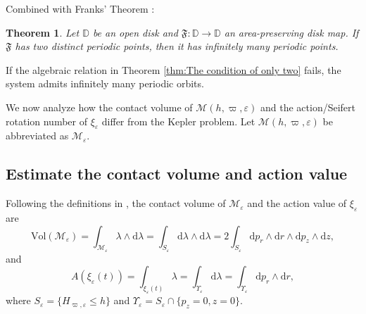 \documentclass[11pt]{amsart}
\newcommand{\ep}{\varepsilon}
\newcommand{\om}{\varpi}
\newtheorem{thm}{Theorem}[section]
\begin{document}
Combined with Franks' Theorem \cite{Franks92}: 
\begin{thm}\label{thm:disk map}  
	Let $ \mathbb{D} $ be an open disk and $ \mathfrak{F}: \mathbb{D} \to \mathbb{D} $ an area-preserving disk map. If $ \mathfrak{F} $ has two distinct periodic points, then it has infinitely many periodic points.  
\end{thm}  
If the algebraic relation in Theorem \ref{thm:The condition of only two} fails, the system admits infinitely many periodic orbits.  

We now analyze how the contact volume of \( \mathcal{M}(h, \om, \ep) \) and the action/Seifert rotation number of $ \xi_{\ep} $ differ from the Kepler problem. Let $ \mathcal{M}(h, \om, \ep) $ be abbreviated as $ \mathcal{M}_\ep $.


\subsection{Estimate the contact volume and action value} Following the definitions in \cite{CHHL23}, the contact volume of $\mathcal{M}_{\ep}$ and the action value of $\xi_{\ep}$ are  
\begin{equation}\label{eq;contect volume}  
	\text{Vol}(\mathcal{M}_{\ep}) = \int_{\mathcal{M}_{\ep}} \lambda \wedge \mathrm{d}\lambda = \int_{S_{\ep}} \mathrm{d}\lambda \wedge \mathrm{d}\lambda = 2 \int_{S_{\ep}} \mathrm{d}p_r \wedge \mathrm{d}r \wedge \mathrm{d}p_z \wedge \mathrm{d}z,  
\end{equation}  
and  
\begin{equation}\label{eq:action}  
	A(\xi_{\ep}(t)) = \int_{\xi_{\ep}(t)} \lambda = \int_{\Upsilon_{\ep}} \mathrm{d}\lambda = \int_{\Upsilon_{\ep}} \mathrm{d}p_r \wedge \mathrm{d}r,  
\end{equation}  
where $S_{\ep}=\{H_{\om,\ep}\leq h\}$ and $\Upsilon_{\ep}=S_{\ep}\cap\{p_z=0,z=0\}$. 
\end{document}

